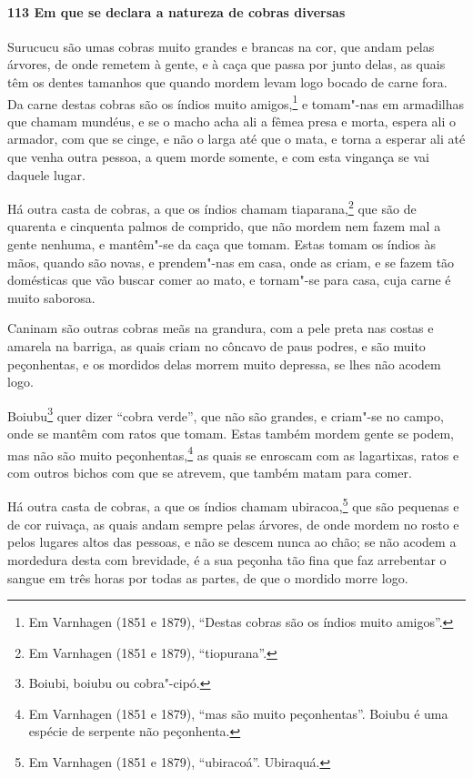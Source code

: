 \begin{linenumbers}
\paragraph{113 Em que se declara a natureza de cobras diversas}\quad
Surucucu são umas cobras muito grandes e brancas na cor, que andam pelas árvores, de onde
remetem à gente, e à caça que passa por junto delas, as quais têm os dentes tamanhos que
quando mordem levam logo bocado de carne fora. Da carne destas cobras são os índios muito
amigos,\footnote{ Em Varnhagen (1851 e 1879), ``Destas cobras são os índios muito
amigos''.} e tomam"-nas em armadilhas que chamam mundéus, e se o macho acha ali a fêmea
presa e morta, espera ali o armador, com que se cinge, e não o larga até que o mata, e
torna a esperar ali até que venha outra pessoa, a quem morde somente, e com esta vingança
se vai daquele lugar.

Há outra casta de cobras, a que os índios chamam tiaparana,\footnote{ Em Varnhagen (1851 e
1879), ``tiopurana''.} que são de quarenta e cinquenta palmos de comprido, que não mordem
nem fazem mal a gente nenhuma, e mantêm"-se da caça que tomam. Estas tomam os índios às
mãos, quando são novas, e prendem"-nas em casa, onde as criam, e se fazem tão domésticas
que vão buscar comer ao mato, e tornam"-se para casa, cuja carne é muito saborosa.

Caninam são outras cobras meãs na grandura, com a pele preta nas costas e amarela na
barriga, as quais criam no côncavo de paus podres, e são muito peçonhentas, e os mordidos
delas morrem muito depressa, se lhes não acodem logo.

Boiubu\footnote{ Boiubi, boiubu ou cobra"-cipó.} quer dizer ``cobra verde'', que não são
grandes, e criam"-se no campo, onde se mantêm com ratos que tomam. Estas também mordem
gente se podem, mas não são muito peçonhentas,\footnote{ Em Varnhagen (1851 e 1879), ``mas
são muito peçonhentas''. Boiubu é uma espécie de serpente não peçonhenta.} as quais se
enroscam com as lagartixas, ratos e com outros bichos com que se atrevem, que também matam
para comer.

Há outra casta de cobras, a que os índios chamam ubiracoa,\footnote{ Em Varnhagen (1851 e
1879), ``ubiracoá''. Ubiraquá.} que são pequenas e de cor ruivaça, as quais andam sempre
pelas árvores, de onde mordem no rosto e pelos lugares altos das pessoas, e não se descem
nunca ao chão; se não acodem a mordedura desta com brevidade, é a sua peçonha tão fina que
faz arrebentar o sangue em três horas por todas as partes, de que o mordido morre logo.


\end{linenumbers}

